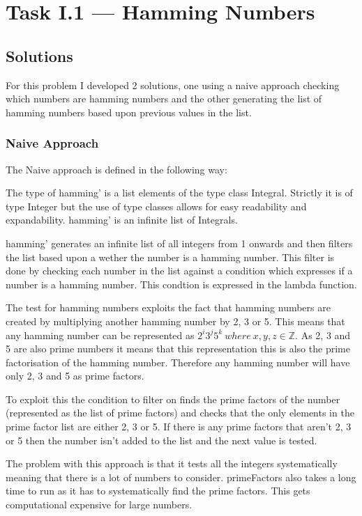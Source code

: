 \documentclass[a4paper]{article}
\begin{document}
\section{Task I.1 --- Hamming Numbers}
\subsection{Solutions}
For this problem I developed 2 solutions, one using a naive approach checking which numbers are hamming numbers and the other generating the list of hamming numbers based upon previous values in the list.
\subsubsection{Naive Approach}
The Naive approach is defined in the following way:


\par
The type of hamming' is a list elements of the type class Integral.
Strictly it is of type Integer but the use of type classes allows for easy readability and expandability.
hamming' is an infinite list of Integrals.
\par
hamming' generates an infinite list of all integers from 1 onwards and then filters the list based upon a wether the number is a hamming number.
This filter is done by checking each number in the list against a condition which expresses if a number is a hamming number.
This condtion is expressed in the lambda function.
\par
The test for hamming numbers exploits the fact that hamming numbers are created by multiplying another hamming number by 2, 3 or 5.
This means that any hamming number can be represented as \( 2^i3^j5^k\  where\ x,y,z \in \mathbb{Z} \).
As 2, 3 and 5 are also prime numbers it means that this representation this is also the prime factorisation of the hamming number.
Therefore any hamming number will have only 2, 3 and 5 as prime factors.
\par
To exploit this the condition to filter on finds the prime factors of the number (represented as the list of prime factors) and checks that the only elements in the prime factor list are either 2, 3 or 5.
If there is any prime factors that aren't 2, 3 or 5 then the number isn't added to the list and the next value is tested.
\\ \par
The problem with this approach is that it tests all the integers systematically meaning that there is a lot of numbers to consider.
primeFactors also takes a long time to run as it has to systematically find the prime factors.
This gets computational expensive for large numbers.
\end{document}
